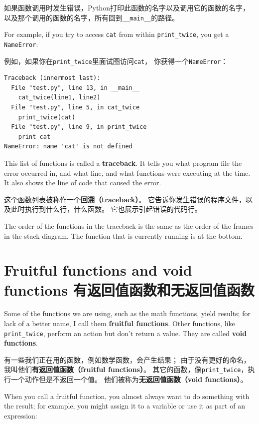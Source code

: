 \documentclass[10pt]{book}
\begin{document}
\begin{CJK}{UTF8}{gbsn}
如果函数调用时发生错误，Python打印此函数的名字以及调用它的函数的名字，
以及那个调用的函数的名字，所有回到\verb"__main__"的路径。

For example, if you try to access {\tt cat} from within 
\verb"print_twice", you get a {\tt NameError}:

例如，如果你在\verb"print_twice"里面试图访问{\tt cat}，
你获得一个{\tt NameError}：

\begin{verbatim}
Traceback (innermost last):
  File "test.py", line 13, in __main__
    cat_twice(line1, line2)
  File "test.py", line 5, in cat_twice
    print_twice(cat)
  File "test.py", line 9, in print_twice
    print cat
NameError: name 'cat' is not defined
\end{verbatim}
%
This list of functions is called a {\bf traceback}.  It tells you what
program file the error occurred in, and what line, and what functions
were executing at the time.  It also shows the line of code that
caused the error.

这个函数列表被称作一个{\bf 回溯（traceback）}。
它告诉你发生错误的程序文件，以及此时执行到什么行，什么函数。
它也展示引起错误的代码行。

The order of the functions in the traceback is the same as the
order of the frames in the stack diagram.  The function that is
currently running is at the bottom.


\section{Fruitful functions and void functions 有返回值函数和无返回值函数}

Some of the functions we are using, such as the math functions, yield
results; for lack of a better name, I call them {\bf fruitful
  functions}.  Other functions, like \verb"print_twice", perform an
action but don't return a value.  They are called {\bf void
  functions}.
  
有一些我们正在用的函数，例如数学函数，会产生结果；
由于没有更好的命名，我叫他们{\bf 有返回值函数（fruitful functions）}。
其它的函数，像\verb"print_twice"，执行一个动作但是不返回一个值。
他们被称为{\bf 无返回值函数（void functions）}。

When you call a fruitful function, you almost always
want to do something with the result; for example, you might
assign it to a variable or use it as part of an expression:


\end{CJK}
\end{document}
